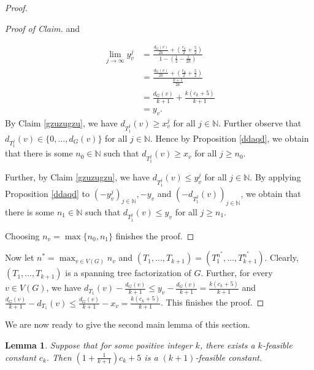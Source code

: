 \documentclass{article}
\theoremstyle{plain}
\newtheorem{Lemma}{Lemma}
\theoremstyle{nonumberplain}
\theoremstyle{nonumberplain}
\newcommand{\stf}{spanning tree factorization }
\begin{document}
\begin{proof}
\begin{proof}[Proof of Claim]
and 


\begin{align*}
\lim_{j \rightarrow \infty}y_v^{j}&=\frac{\frac{d_G(v)}{2k}+(\frac{c_k}{2}+\frac{5}{2})}{1-(\frac{1}{2}-\frac{1}{2k})}\\
&=\frac{\frac{d_G(v)}{2k}+(\frac{c_k}{2}+\frac{5}{2})}{\frac{k+1}{2k}}\\
&=\frac{d_G(v)}{k+1}+\frac{k(c_k+5)}{k+1}\\
&=y_v.
\end{align*}
By Claim \ref{gzuzugzu}, we have $d_{T_1^{j}}(v)\geq x_v^{j}$ for all $j \in \mathbb{N}$. Further observe that $d_{T_1^{j}}(v)\in \{0,\ldots,d_G(v)\}$  for all $j \in \mathbb{N}$. Hence by Proposition \ref{ddaqd}, we obtain that there is some $n_0 \in \mathbb{N}$ such that $d_{T_1^{j}}(v)\geq x_v$ for all $j \geq n_0$. 

Further, by Claim \ref{gzuzugzu}, we have $d_{T_1^{j}}(v)\leq y_v^{j}$ for all $j \in \mathbb{N}$. By applying Proposition \ref{ddaqd} to $(-y_v^{j})_{j \in \mathbb{N}},-y_v$ and $(-d_{T_1^{j}}(v))_{j \in \mathbb{N}}$, we obtain that there is some $n_1 \in \mathbb{N}$ such that $d_{T_1^{j}}(v)\leq y_v$ for all $j \geq n_1$. 

Choosing $n_v=\max\{n_0,n_1\}$ finishes the proof.
\renewcommand{\qedsymbol}{$\blacksquare$}
\end{proof}
Now let $n^*=\max_{v \in V(G)}n_v$ and $(T_1,\ldots,T_{k+1})=(T_1^{n^*},\ldots,T_{k+1}^{n^*})$. Clearly, $(T_1,\ldots,T_{k+1})$ is a \stf of $G$. Further, for every $v \in V(G)$, we have $d_{T_1}(v)-\frac{d_G(v)}{k+1}\leq y_v-\frac{d_G(v)}{k+1}=\frac{k(c_k+5)}{k+1}$ and $\frac{d_G(v)}{k+1}-d_{T_1}(v)\leq\frac{d_G(v)}{k+1}-x_v=\frac{k(c_k+5)}{k+1}$. This finishes the proof.
\end{proof}
We are now ready to give the second main lemma of this section.
\begin{Lemma}\label{rdztd}
Suppose that for some positive integer $k$, there exists a $k$-feasible constant $c_k$. Then $(1+\frac{1}{k+1})c_k+5$ is a $(k+1)$-feasible constant.
\end{Lemma}
\end{document}

